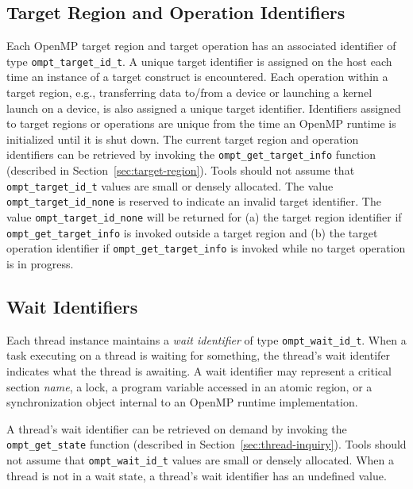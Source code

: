 \documentclass{article}
\begin{document}
\subsection{Target Region and Operation Identifiers}
Each OpenMP target region and target operation has an associated identifier of type \verb|ompt_target_id_t|. 
A unique target identifier is assigned on the host each time an instance of a target construct is encountered.
Each operation within a target region, e.g., transferring data to/from a device or launching a kernel launch 
on a device, is also assigned a unique target identifier. 
Identifiers assigned to target regions or operations 
are unique from the time an OpenMP runtime is initialized until it is shut down. 
The current target region and operation identifiers can be retrieved by invoking the \verb|ompt_get_target_info| function (described in Section~\ref{sec:target-region}).
Tools should not assume that \verb|ompt_target_id_t| values are small or densely allocated. 
The value \verb|ompt_target_id_none| is reserved to indicate an invalid target identifier. 
The value \verb|ompt_target_id_none| will be returned for (a) the target region identifier if \verb|ompt_get_target_info| is invoked outside a target region and (b) the target operation identifier if \verb|ompt_get_target_info| is invoked while no target operation is in progress.

\subsection{Wait Identifiers}
Each thread instance maintains a {\em wait identifier} of type \verb|ompt_wait_id_t|. 
When a task executing on a thread is waiting for something, the thread's wait identifer indicates what the thread is awaiting. 
A wait identifier may represent a critical section {\em name}, a lock,  a program variable accessed in an atomic region, or a synchronization object internal to an OpenMP runtime implementation. 

A thread's wait identifier can be retrieved on demand by invoking the \verb|ompt_get_state| function (described in Section~\ref{sec:thread-inquiry}).
Tools should not assume that \verb|ompt_wait_id_t| values are small or densely allocated. 
When a thread is not in a wait state, a thread's wait identifier has an undefined value.
 
\end{document}
